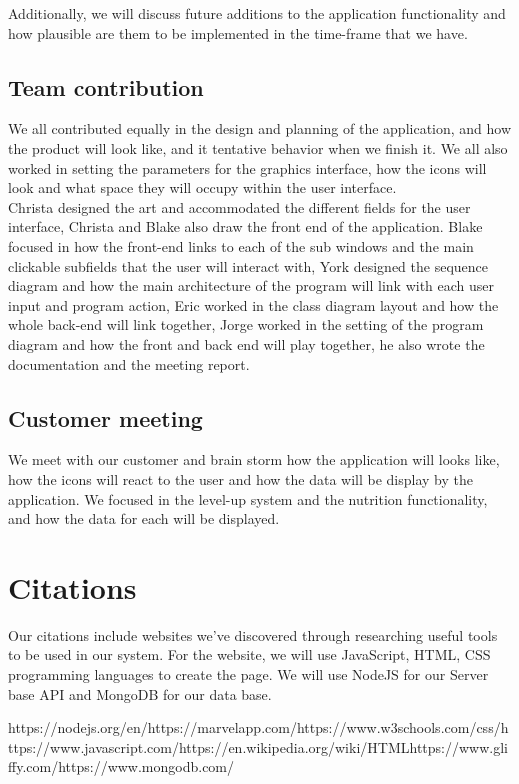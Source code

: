 \documentclass[a4paper]{article}
\begin{document}
\noindent Additionally, we will discuss future additions to the application functionality and how plausible are them to be implemented in the time-frame that we have.

\subsection{Team contribution}
We all contributed equally in the design and planning of the application, and how  the product will look like, and  it tentative behavior when we finish it. We all also worked in setting the parameters for the graphics interface, how the icons will look and what space they will occupy within the user interface. \\

\noindent Christa designed the art and accommodated the different fields for the user interface, Christa and Blake also draw the front end of the application. Blake focused in how the front-end links to each of the sub windows and the main clickable subfields that the user will interact with, York designed the sequence diagram and how the main architecture of the program will link with each user input and program action, Eric worked in the class diagram layout and how the whole back-end will link together, Jorge worked in the setting of the program diagram and how the front and back end will play together, he also wrote the documentation and the meeting report.


\subsection{Customer meeting}
We meet with our customer and brain storm how the application will looks like, how the icons will react to the user and how the data will be display by the application. We focused in the level-up system and the nutrition functionality, and how the data for each will be displayed.

\pagebreak
\section{Citations}
Our citations include websites we've discovered through researching useful tools to be used in our system. For the website, we will use JavaScript, HTML, CSS programming languages to create the page. We will use NodeJS for our Server base API and MongoDB for our data base. 
\newline

\noindent[1] https://nodejs.org/en/\newline
[2] https://marvelapp.com/\newline
[3] https://www.w3schools.com/css/\newline
[4] https://www.javascript.com/\newline
[5] https://en.wikipedia.org/wiki/HTML\newline
[6] https://www.gliffy.com/\newline
[7] https://www.mongodb.com/\newline
\end{document}
